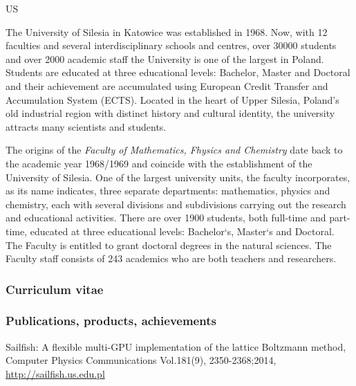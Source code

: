 \begin{sitedescription}{US}

The University of Silesia in Katowice was established in 1968. Now,
with 12 faculties and several interdisciplinary schools and centres,
over 30000 students and over 2000 academic staff the University is one
of the largest in Poland. Students are educated at three educational
levels: Bachelor, Master and Doctoral and their achievement are
accumulated using European Credit Transfer and Accumulation System
(ECTS). Located in the heart of Upper Silesia, Poland's old industrial
region with distinct history and cultural identity, the university
attracts many scientists and students.

The origins of the {\em Faculty of Mathematics, Fhysics and Chemistry} date
back to the academic year 1968/1969 and coincide with the
establishment of the University of Silesia. One of the largest
university units, the faculty incorporates, as its name indicates,
three separate departments: mathematics, physics and chemistry, each
with several divisions and subdivisions carrying out the research and
educational activities. There are over 1900 students, both full-time
and part-time, educated at three educational levels: Bachelor`s,
Master`s and Doctoral. The Faculty is entitled to grant doctoral
degrees in the natural sciences. The Faculty staff consists of 243
academics who are both teachers and researchers.

\subsubsection*{Curriculum vitae}





%
%

\subsubsection*{Publications, products, achievements}


\begin{compactenum}

\item Sailfish: A flexible multi-GPU implementation of the lattice Boltzmann method,
 Computer Physics Communications Vol.181(9), 2350-2368;2014,
 \url{http://sailfish.us.edu.pl} 


\end{compactenum}
\end{sitedescription}
